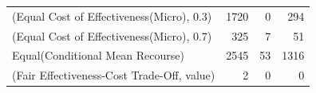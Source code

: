 \documentclass{article}
\begin{document}
\begin{table}[ht]
{\begin{tabular}{lrrr}
(Equal Cost of Effectiveness(Micro), 0.3)          &            1720 &                                                        0 &                                   294 \\
(Equal Cost of Effectiveness(Micro), 0.7)          &             325 &                                                         7 &                                    51 \\
Equal(Conditional Mean Recourse)                   &            2545 &                                                      53 &                                  1316 \\
(Fair Effectiveness-Cost Trade-Off, value)         &               2 &                                                       0 &                                     0 \\

\bottomrule
\end{tabular}}
\end{table}
\end{document}
